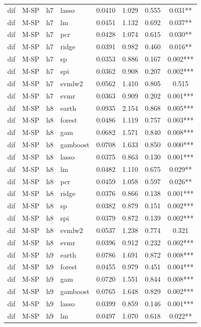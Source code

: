 \begin{ThreePartTable}
\begin{longtable}[t]{llclcccc}
dif & M-SP & h7 & lasso & 0.0410 & 1.029 & 0.555 & 0.031**\\
dif & M-SP & h7 & lm & 0.0451 & 1.132 & 0.692 & 0.037**\\
dif & M-SP & h7 & pcr & 0.0428 & 1.074 & 0.615 & 0.030**\\
dif & M-SP & h7 & ridge & 0.0391 & 0.982 & 0.460 & 0.016**\\
dif & M-SP & h7 & sp & 0.0353 & 0.886 & 0.167 & 0.002***\\
dif & M-SP & h7 & spi & 0.0362 & 0.908 & 0.207 & 0.002***\\
dif & M-SP & h7 & svmlw2 & 0.0562 & 1.410 & 0.805 & 0.515\\
dif & M-SP & h7 & svmr & 0.0363 & 0.909 & 0.202 & 0.001***\\
\addlinespace
dif & M-SP & h8 & earth & 0.0935 & 2.154 & 0.868 & 0.005***\\
dif & M-SP & h8 & forest & 0.0486 & 1.119 & 0.757 & 0.003***\\
dif & M-SP & h8 & gam & 0.0682 & 1.571 & 0.840 & 0.008***\\
dif & M-SP & h8 & gamboost & 0.0708 & 1.633 & 0.850 & 0.000***\\
dif & M-SP & h8 & lasso & 0.0375 & 0.863 & 0.130 & 0.001***\\
dif & M-SP & h8 & lm & 0.0482 & 1.110 & 0.675 & 0.029**\\
dif & M-SP & h8 & pcr & 0.0459 & 1.058 & 0.597 & 0.026**\\
dif & M-SP & h8 & ridge & 0.0376 & 0.866 & 0.138 & 0.001***\\
dif & M-SP & h8 & sp & 0.0382 & 0.879 & 0.151 & 0.002***\\
dif & M-SP & h8 & spi & 0.0379 & 0.872 & 0.139 & 0.002***\\
dif & M-SP & h8 & svmlw2 & 0.0537 & 1.238 & 0.774 & 0.321\\
dif & M-SP & h8 & svmr & 0.0396 & 0.912 & 0.232 & 0.002***\\
\addlinespace
dif & M-SP & h9 & earth & 0.0786 & 1.691 & 0.872 & 0.008***\\
dif & M-SP & h9 & forest & 0.0455 & 0.979 & 0.451 & 0.004***\\
dif & M-SP & h9 & gam & 0.0720 & 1.551 & 0.844 & 0.008***\\
dif & M-SP & h9 & gamboost & 0.0765 & 1.648 & 0.829 & 0.002***\\
dif & M-SP & h9 & lasso & 0.0399 & 0.859 & 0.146 & 0.001***\\
dif & M-SP & h9 & lm & 0.0497 & 1.070 & 0.618 & 0.022**\\

\end{longtable}
\end{ThreePartTable}
